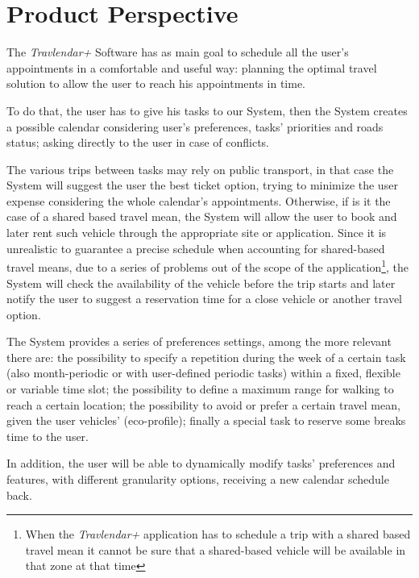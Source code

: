 \section{Product Perspective}
The \emph{Travlendar+} Software has as main goal to schedule all the user's appointments in a comfortable and useful way: planning the optimal travel solution to allow the user to reach his appointments in time.

To do that, the user has to give his tasks to our System, then the System creates a possible calendar considering user's preferences, tasks' priorities and roads status; asking directly to the user in case of conflicts.

The various trips between tasks may rely on public transport, in that case the System will suggest the user the best ticket option, trying to minimize the user expense considering the whole calendar's appointments. Otherwise, if is it the case of a shared based travel mean, the System will allow the user to book and later rent such vehicle through the appropriate site or application.
Since it is unrealistic to guarantee a precise schedule when accounting for shared-based travel means, due to a series of problems out of the scope of the application\footnote{When the \emph{Travlendar+} application has to schedule a trip with a shared based travel mean it cannot be sure that a shared-based vehicle will be available in that zone at that time}, the System will check the availability of the vehicle before the trip starts and later notify the user to suggest a reservation time for a close vehicle or another travel option.    

The System provides a series of preferences settings, among the more relevant there are: the possibility to specify a repetition during the week of a certain task (also month-periodic or with user-defined periodic tasks) within a fixed, flexible or variable time slot; the possibility to define a maximum range for walking to reach a certain location; the possibility to avoid or prefer a certain travel mean, given the user vehicles' (eco-profile); finally a special task to reserve some breaks time to the user.

In addition, the user will be able to dynamically modify tasks' preferences and features, with different granularity options, receiving a new calendar schedule back.

